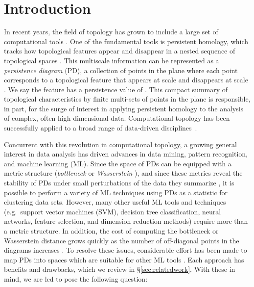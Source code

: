 \documentclass[11pt]{article}
\begin{document}
\section{Introduction}\label{sec:intro}
    
In recent years, the field of topology has grown to include a large set of computational tools \citep{Edelsbrunner10}. One of the fundamental tools is persistent homology, which tracks how topological features appear and disappear in a nested sequence of topological spaces \citep{edelsbrunner2008persistent,computingPH}. This multiscale information can be represented as a \emph{persistence diagram} (PD), a collection of points in the plane where each point  corresponds to a topological feature that appears at scale  and disappears at scale .  We say the feature has a persistence value of . This compact summary of topological characteristics by finite multi-sets of points in the plane is responsible, in part, for the surge of interest in applying persistent homology to the analysis of complex, often high-dimensional data. Computational topology has been successfully applied to a broad range of data-driven disciplines~\citep{windowsandpersistence, hippocampalPH, chung2009persistence, imagewebs, visionTDA, Swarms, ions}. 

Concurrent with this revolution in computational topology, a growing general interest in data analysis has driven advances in data mining, pattern recognition, and machine learning (ML). Since the space of PDs can be equipped with a metric structure (\emph{bottleneck} or \emph{Wasserstein} \citep{probabilityonPD, turner2014frechet}), and since these metrics reveal the stability of PDs under small perturbations of the data they summarize \citep{stabilityPD, cohen2010lipschitz, chazal2014persistence}, it is possible to perform a variety of ML techniques using PDs as a statistic for clustering data sets. However, many other useful ML tools and techniques (e.g.\ support vector machines (SVM), decision tree classification, neural networks, feature selection, and dimension reduction methods) require more than a metric structure. In addition, the cost of computing the bottleneck or Wasserstein distance grows quickly as the number of off-diagonal points in the diagrams increases \citep{di2015comparing}. To resolve these issues, considerable effort has been made to map PDs into spaces which are suitable for other ML tools \citep{bubenik2015statistical, reininghaus2015stable,bendich2014topologicalLiz,adcock2012ring,donatini1998size,ferri1997point,chung2009persistence,pachauri2011topology,bendich2014persistent,chen2015statistical,carriere2015stable,di2015comparing}. Each approach has benefits and drawbacks, which we review in \S\ref{sec:relatedwork}.  With these in mind, we are led to pose the following question:
\end{document}
